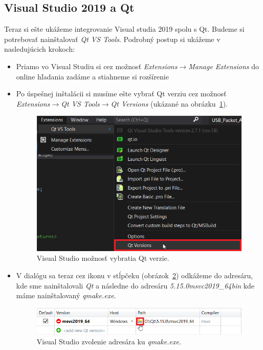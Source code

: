 \clearpage

\subsection{Visual Studio 2019 a Qt}
\label{kap4:sec:VS2019_qt}
Teraz si ešte ukážeme integrovanie Visual studia 2019 spolu s Qt. Budeme si potrebovať nainštalovať \textit{Qt VS Tools}. Podrobný postup si ukážeme v nasledujúcich krokoch:
\begin{itemize}
\label{kap4:qt_vs_integ}
\item Priamo vo Visual Studiu si cez možnosť \textit{Extensions}$\rightarrow$\textit{Manage Extensions} do online hľadania zadáme  a stiahneme si rozšírenie ~\cite{qt_vs_tools}
\item\label{kap4:qt_vs_integ:krok2} Po úspešnej inštalácii si musíme ešte vybrať Qt verziu cez možnosť \textit{Extensions}$\rightarrow$\textit{Qt VS Tools}$\rightarrow$\textit{Qt Versions} (ukázané na obrázku~\ref{obr:kap4:vs_versions}).

\begin{figure}[!htb]
	\centering
	\includegraphics[width=12cm]{img/kap04_vs_versions}
	\caption{Visual Studio možnosť vybratia Qt verzie.}
	\label{obr:kap4:vs_versions}
\end{figure}

\item V dialógu sa teraz cez ikonu v stĺpčeku  (obrázok~\ref{obr:kap4:vs_path}) odkážeme do adresáru, kde sme nainštalovali \textit{Qt} a následne do adresáru \textit{5.15.0\/msvc2019\_64\/bin} kde máme nainštalovaný \textit{qmake.exe}.

\begin{figure}[!htb]
	\centering
	\includegraphics[width=12cm]{img/kap04_vs_path}
	\caption{Visual Studio zvolenie adresára ku \textit{qmake.exe}.}
	\label{obr:kap4:vs_path}
\end{figure}


\end{itemize}
